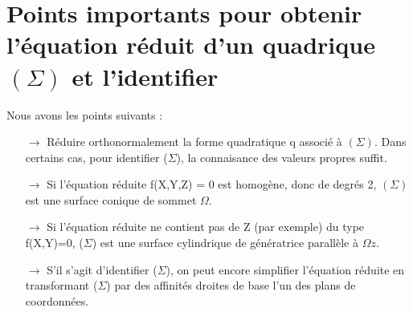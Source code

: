 \chapter{Points importants pour obtenir l'équation réduit d'un quadrique $(\Sigma)$ et l'identifier}
Nous avons les points suivants :
\begin{itemize}
 \item[$\rightarrow$] Réduire orthonormalement la forme quadratique q associé à $(\Sigma)$. Dans certains cas, pour identifier ($\Sigma$), la connaisance des valeurs propres suffit.
 \item[$\rightarrow$] Si l'équation réduite f(X,Y,Z) = 0 est homogène, donc de degrés 2, $(\Sigma)$ est une surface conique de sommet $\Omega$.
 \item[$\rightarrow$] Si l'équation réduite ne contient pas de Z (par exemple) du type f(X,Y)=0, ($\Sigma$) est une surface cylindrique de génératrice parallèle à $\Omega z$.
 \item[$\rightarrow$] S'il s'agit d'identifier ($\Sigma$), on peut encore simplifier l'équation réduite en transformant ($\Sigma$) par des affinités droites de base l'un des plans de coordonnées.
\end{itemize}

